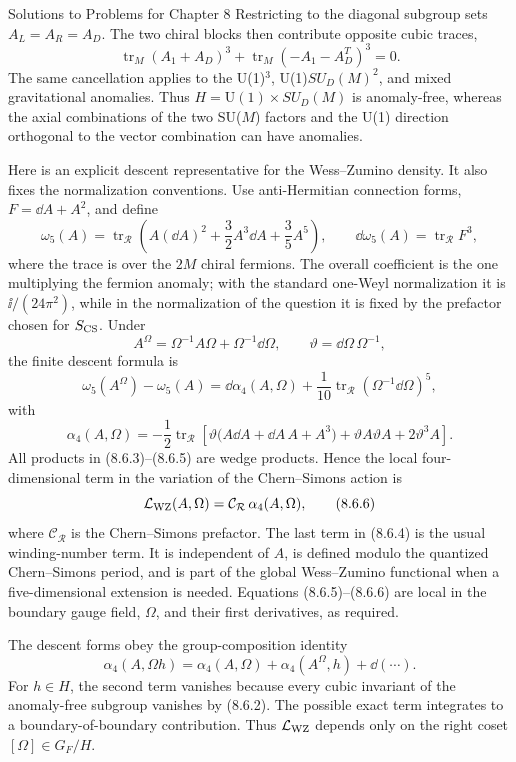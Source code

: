 \begin{bankssolutions}{Solutions to Problems for Chapter 8}
Restricting to the diagonal subgroup sets $A_L=A_R=A_D$.  The two chiral
blocks then contribute opposite cubic traces,
\[
  \operatorname{tr}_M(A_1+A_D)^3
  +\operatorname{tr}_M(-A_1-A_D^T)^3=0 .
  \tag{8.6.2}
\]
The same cancellation applies to the U(1)$^3$, U(1)$SU_D(M)^2$, and mixed
gravitational anomalies.  Thus $H=\mathrm{U}(1)\times SU_D(M)$ is
anomaly-free, whereas the axial combinations of the two SU($M$) factors and
the U(1) direction orthogonal to the vector combination can have anomalies.

Here is an explicit descent representative for the Wess--Zumino density.
It also fixes the normalization conventions.  Use anti-Hermitian connection
forms, $F=\dd A+A^2$, and define
\[
  \omega_5(A)=\operatorname{tr}_{\mathcal R}
  \left(A(\dd A)^2+\frac32A^3\dd A+\frac35A^5\right),
  \qquad \dd\omega_5(A)=\operatorname{tr}_{\mathcal R}F^3,
  \tag{8.6.3}
\]
where the trace is over the $2M$ chiral fermions.  The overall coefficient is
the one multiplying the fermion anomaly; with the standard one-Weyl
normalization it is $\ii/(24\pi^2)$, while in the normalization of the
question it is fixed by the prefactor chosen for $S_{\rm CS}$.  Under
\[
  A^\Omega=\Omega^{-1}A\Omega+\Omega^{-1}\dd\Omega,
  \qquad \vartheta=\dd\Omega\,\Omega^{-1},
\]
the finite descent formula is
\[
  \omega_5(A^\Omega)-\omega_5(A)
  =\dd\alpha_4(A,\Omega)
   +\frac1{10}\operatorname{tr}_{\mathcal R}(\Omega^{-1}\dd\Omega)^5,
  \tag{8.6.4}
\]
with
\[
  \alpha_4(A,\Omega)=
  -\frac12\operatorname{tr}_{\mathcal R}\!\left[
    \vartheta\bigl(A\dd A+\dd A\,A+A^3\bigr)
    +\vartheta A\vartheta A+2\vartheta^3A\right].
  \tag{8.6.5}
\]
All products in (8.6.3)--(8.6.5) are wedge products.  Hence the local
four-dimensional term in the variation of the Chern--Simons action is
\[
  \mathcal L_{\rm WZ}(A,\Omega)=\mathcal C_{\mathcal R}\,\alpha_4(A,\Omega),
  \tag{8.6.6}
\]
where $\mathcal C_{\mathcal R}$ is the Chern--Simons prefactor.  The last
term in (8.6.4) is the usual winding-number term.  It is independent of $A$,
is defined modulo the quantized Chern--Simons period, and is part of the
global Wess--Zumino functional when a five-dimensional extension is needed.
Equations (8.6.5)--(8.6.6) are local in the boundary gauge field, $\Omega$,
and their first derivatives, as required.

The descent forms obey the group-composition identity
\[
  \alpha_4(A,\Omega h)=\alpha_4(A,\Omega)
  +\alpha_4(A^\Omega,h)+\dd(\cdots).
  \tag{8.6.7}
\]
For $h\in H$, the second term vanishes because every cubic invariant of the
anomaly-free subgroup vanishes by (8.6.2).  The possible exact term integrates
to a boundary-of-boundary contribution.  Thus $\mathcal L_{\rm WZ}$ depends
only on the right coset $[\Omega]\in G_F/H$.


\end{bankssolutions}
